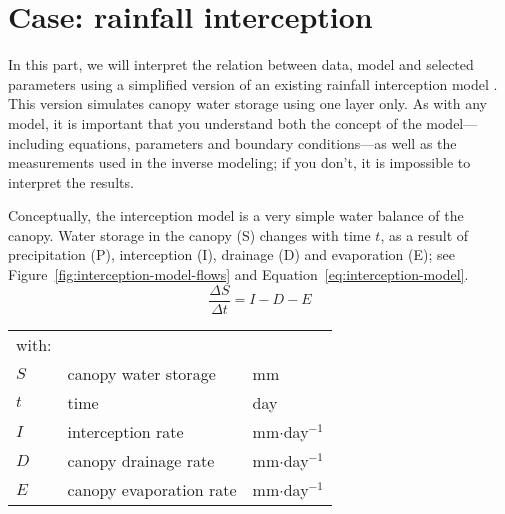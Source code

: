




\section{Case: rainfall interception}

In this part, we will interpret the relation between data, model and selected
parameters using a simplified version of an existing rainfall interception model
\citep{bout-scha-aert-verm1996}. This version simulates canopy water storage
using one layer only. As with any model, it is important that you understand
both the concept of the model---including equations, parameters and boundary
conditions---as well as the measurements used in the inverse modeling; if you
don't, it is impossible to interpret the results.

Conceptually, the interception model is a very simple water balance of the
canopy. Water storage in the canopy (S) changes with time $t$, as a result of
precipitation (P), interception (I), drainage (D) and evaporation (E); see
Figure~\ref{fig:interception-model-flows} and
Equation~\ref{eq:interception-model}.
\begin{equation}
\label{eq:interception-model}
\frac{\Delta S}{\Delta t} = I-D-E
\end{equation}
\begin{tabular}{lll}
with:&&\\
$S$&canopy water storage&\textsf{mm}\\
$t$&time&\textsf{day}\\
$I$&interception rate&\textsf{mm$\cdot{}$day$^{-1}$}\\
$D$&canopy drainage rate&\textsf{mm$\cdot{}$day$^{-1}$}\\
$E$&canopy evaporation rate&\textsf{mm$\cdot{}$day$^{-1}$}\\
\end{tabular}

